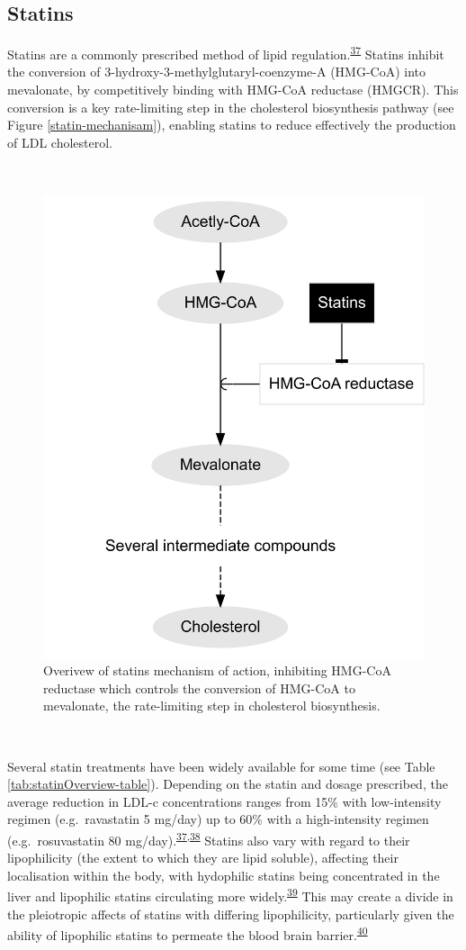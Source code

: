 \documentclass[a4paper, twoside]{templates/ociamthesis}
\begin{document}
\hypertarget{intro-statins}{%
\subsection{Statins}\label{intro-statins}}

Statins are a commonly prescribed method of lipid regulation.\textsuperscript{\protect\hyperlink{ref-collins2016}{37}} Statins inhibit the conversion of 3-hydroxy-3-methylglutaryl-coenzyme-A (HMG-CoA) into mevalonate, by competitively binding with HMG-CoA reductase (HMGCR). This conversion is a key rate-limiting step in the cholesterol biosynthesis pathway (see Figure \ref{statin-mechanisam}), enabling statins to reduce effectively the production of LDL cholesterol.

~





\begin{figure}[H]

{\centering \includegraphics[width=0.5\linewidth]{figures/background/statinPath} 

}

\caption[Statin mechanism of action]{Overivew of statins mechanism of action, inhibiting HMG-CoA reductase which controls the conversion of HMG-CoA to mevalonate, the rate-limiting step in cholesterol biosynthesis.}\label{fig:statin-mechanisam}
\end{figure}

~

Several statin treatments have been widely available for some time (see Table \ref{tab:statinOverview-table}). Depending on the statin and dosage prescribed, the average reduction in LDL-c concentrations ranges from 15\% with low-intensity regimen (e.g.~ravastatin 5 mg/day) up to 60\% with a high-intensity regimen (e.g.~rosuvastatin 80 mg/day).\textsuperscript{\protect\hyperlink{ref-collins2016}{37},\protect\hyperlink{ref-law2003}{38}} Statins also vary with regard to their lipophilicity (the extent to which they are lipid soluble), affecting their localisation within the body, with hydophilic statins being concentrated in the liver and lipophilic statins circulating more widely.\textsuperscript{\protect\hyperlink{ref-schachter2005}{39}} This may create a divide in the pleiotropic affects of statins with differing lipophilicity, particularly given the ability of lipophilic statins to permeate the blood brain barrier.\textsuperscript{\protect\hyperlink{ref-sierra2011}{40}}
\end{document}
